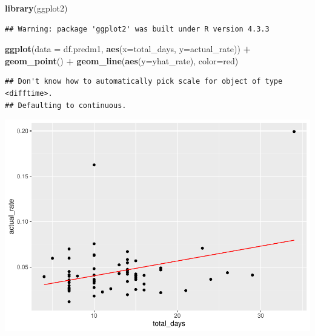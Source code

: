 \documentclass[
  11,
]{book}
\newenvironment{Shaded}{\begin{snugshade}}{\end{snugshade}}
\newcommand{\AttributeTok}[1]{\textcolor[rgb]{0.27,0.27,0.27}{#1}}
\newcommand{\FunctionTok}[1]{\textcolor[rgb]{0.27,0.27,0.27}{\textbf{#1}}}
\newcommand{\NormalTok}[1]{#1}
\newcommand{\SpecialCharTok}[1]{\textcolor[rgb]{0.43,0.43,0.43}{\textbf{#1}}}
\newcommand{\StringTok}[1]{\textcolor[rgb]{0.5,0.5,0.5}{#1}}
\begin{document}
\begin{Shaded}
\begin{Highlighting}[]
\FunctionTok{library}\NormalTok{(ggplot2)}
\end{Highlighting}
\end{Shaded}

\begin{verbatim}
## Warning: package 'ggplot2' was built under R version 4.3.3
\end{verbatim}

\begin{Shaded}
\begin{Highlighting}[]
\FunctionTok{ggplot}\NormalTok{(}\AttributeTok{data =}\NormalTok{ df.predm1, }\FunctionTok{aes}\NormalTok{(}\AttributeTok{x=}\NormalTok{total\_days, }\AttributeTok{y=}\NormalTok{actual\_rate)) }\SpecialCharTok{+} 
  \FunctionTok{geom\_point}\NormalTok{() }\SpecialCharTok{+}
  \FunctionTok{geom\_line}\NormalTok{(}\FunctionTok{aes}\NormalTok{(}\AttributeTok{y=}\NormalTok{yhat\_rate), }\AttributeTok{color=}\StringTok{\textquotesingle{}red\textquotesingle{}}\NormalTok{)}
\end{Highlighting}
\end{Shaded}

\begin{verbatim}
## Don't know how to automatically pick scale for object of type <difftime>.
## Defaulting to continuous.
\end{verbatim}

\includegraphics{_main_files/figure-latex/predm1_plot-1.pdf}

  
\end{document}
